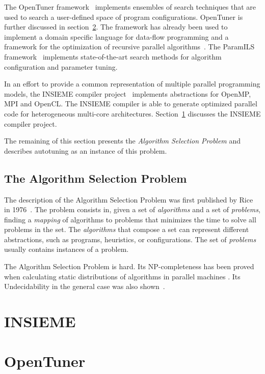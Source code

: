 \documentclass[a4paper, 12pt]{article}
\begin{document}
The OpenTuner framework~\cite{ansel2014opentuner} implements ensembles of search
techniques that are used to search a user-defined space of program
configurations. OpenTuner is further discussed in section~\ref{sec:opentuner}.
The framework has already been used to implement a domain specific language
for data-flow programming \cite{bosboom2014streamjit}
and a framework for the optimization of recursive parallel
algorithms~\cite{eliahu2015frpa}. The ParamILS
framework~\cite{hutter2009paramils} implements state-of-the-art search methods
for algorithm configuration and parameter tuning.

In an effort to provide a common representation of multiple parallel
programming models, the INSIEME compiler project~\cite{jordan2012multi}
implements abstractions for OpenMP, MPI and OpenCL. The INSIEME compiler is
able to generate optimized parallel code for heterogeneous multi-core
architectures. Section~\ref{sec:insieme} discusses the INSIEME compiler project.

The remaining of this section presents the \emph{Algorithm Selection Problem}
and describes autotuning as an instance of this problem.

\subsection{The Algorithm Selection Problem}

The description of the Algorithm Selection Problem was first published by Rice
in 1976~\cite{rice1976algorithm}. The problem consists in, given a set of
\emph{algorithms} and a set of \emph{problems}, finding a \emph{mapping} of
algorithms to problems that minimizes the time to solve all problems in the set.
The \emph{algorithms} that compose a set can represent different abstractions,
such as programs, heuristics, or configurations. The set of \emph{problems}
usually contains instances of a problem.

The Algorithm Selection Problem is hard. Its NP-completeness has been proved
when calculating static distributions of algorithms in parallel machines
\cite{bougeret2009combining}. Its Undecidability in the general case was also
shown~\cite{guo2003algorithm}.

\section{INSIEME} \label{sec:insieme}

\section{OpenTuner} \label{sec:opentuner}
\end{document}
